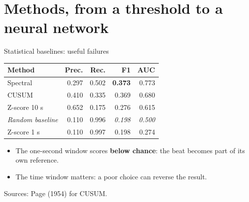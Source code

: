 \documentclass[aspectratio=169,10pt]{beamer}
\newcommand{\good}[1]{\textbf{#1}}
\newcommand{\sources}[1]{%
  \vfill
  {\tiny\color{gray}Sources: #1}
}
\begin{document}
\section{Methods, from a threshold to a neural network}

\begin{frame}{Statistical baselines: useful failures}

      \centering
      \small
      \begin{tabular}{lrrrr}
        \toprule
        Method & Prec. & Rec. & F1 & AUC \\
        \midrule
        Spectral & 0.297 & 0.502 & \good{0.373} & 0.773 \\
        CUSUM & 0.410 & 0.335 & 0.369 & 0.680 \\
        Z-score 10 s & 0.652 & 0.175 & 0.276 & 0.615 \\
        \textit{Random baseline} & 0.110 & 0.996 & \textit{0.198} & \textit{0.500} \\
        Z-score 1 s & 0.110 & 0.997 & 0.198 & \alert{0.274} \\
        \bottomrule
      \end{tabular}

      \normalsize
      \vspace{0.8em}

      \begin{itemize}
        \item The one-second window scores \textbf{below chance}: the beat becomes part of
          its own reference.
        \item The time window matters: a poor choice can reverse the result.
      \end{itemize}


  \sources{Page (1954) for CUSUM.}

\end{frame}
\end{document}
